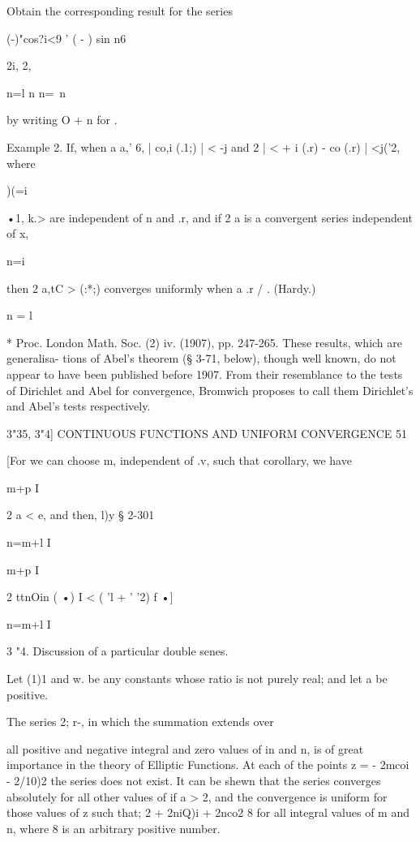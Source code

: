 Obtain the corresponding result for the series

  (-)"cos?i<9 ' ( - ) sin n6

2i, 2,

n=l n n=\ n

by writing O + n for .

Example 2. If, when a a,' 6, | co,i (.1;) | < -j and 2 | < + i (.r) -
co (.r) | <j('2, where

)(=i

 •1, k.> are independent of n and .r, and if 2 a is a convergent
series independent of x,

n=i

then 2 a,tC > (:*;) converges uniformly when a .r / . (Hardy.)

n = l

* Proc. London Math. Soc. (2) iv. (1907), pp. 247-265. These results,
which are generalisa- tions of Abel's theorem (§ 3-71, below), though
well known, do not appear to have been published before 1907. From
their resemblance to the tests of Dirichlet and Abel for convergence,
Bromwich proposes to call them Dirichlet's and Abel's tests
respectively.



3"35, 3"4] CONTINUOUS FUNCTIONS AND UNIFORM CONVERGENCE 51

[For we can choose m, independent of .v, such that corollary, we have



m+p I

2 a < e, and then, l)y § 2-301

n=m+l I



m+p I

2 ttnOin ( •) I < ( 'l + ' '2) f •]



n=m+l I

3 "4. Discussion of a particular double senes.

Let (1)1 and w. be any constants whose ratio is not purely real; and
let a be positive.

The series 2; r-, in which the summation extends over

all positive and negative integral and zero values of in and n, is of
great importance in the theory of Elliptic Functions. At each of the
points z = - 2mcoi - 2/10)2 the series does not exist. It can be shewn
that the series converges absolutely for all other values of if a > 2,
and the convergence is uniform for those values of z such that; 2 +
2niQ)i + 2nco2 8 for all integral values of m and n, where 8 is an
arbitrary positive number.

